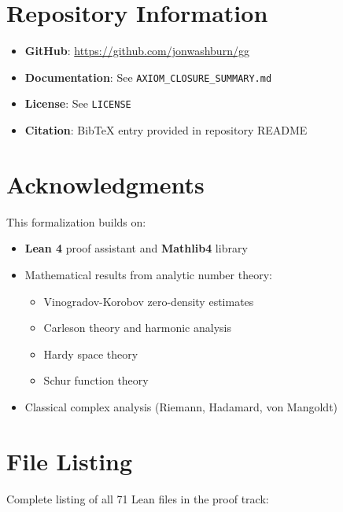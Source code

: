 \section{Repository Information}

\begin{itemize}
    \item \textbf{GitHub}: \url{https://github.com/jonwashburn/gg}
    \item \textbf{Documentation}: See \texttt{AXIOM\_CLOSURE\_SUMMARY.md}
    \item \textbf{License}: See \texttt{LICENSE}
    \item \textbf{Citation}: BibTeX entry provided in repository README
\end{itemize}

\section{Acknowledgments}

This formalization builds on:
\begin{itemize}
    \item \textbf{Lean 4} proof assistant and \textbf{Mathlib4} library
    \item Mathematical results from analytic number theory:
    \begin{itemize}
        \item Vinogradov-Korobov zero-density estimates
        \item Carleson theory and harmonic analysis
        \item Hardy space theory
        \item Schur function theory
    \end{itemize}
    \item Classical complex analysis (Riemann, Hadamard, von Mangoldt)
\end{itemize}

\appendix

\section{File Listing}

Complete listing of all 71 Lean files in the proof track:

